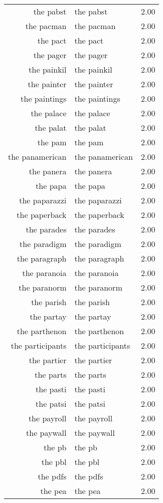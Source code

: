 \begin{table}[ht]
\begin{tabular}{rlr}
  the pabst & the pabst & 2.00 \\ 
  the pacman & the pacman & 2.00 \\ 
  the pact & the pact & 2.00 \\ 
  the pager & the pager & 2.00 \\ 
  the painkil & the painkil & 2.00 \\ 
  the painter & the painter & 2.00 \\ 
  the paintings & the paintings & 2.00 \\ 
  the palace & the palace & 2.00 \\ 
  the palat & the palat & 2.00 \\ 
  the pam & the pam & 2.00 \\ 
  the panamerican & the panamerican & 2.00 \\ 
  the panera & the panera & 2.00 \\ 
  the papa & the papa & 2.00 \\ 
  the paparazzi & the paparazzi & 2.00 \\ 
  the paperback & the paperback & 2.00 \\ 
  the parades & the parades & 2.00 \\ 
  the paradigm & the paradigm & 2.00 \\ 
  the paragraph & the paragraph & 2.00 \\ 
  the paranoia & the paranoia & 2.00 \\ 
  the paranorm & the paranorm & 2.00 \\ 
  the parish & the parish & 2.00 \\ 
  the partay & the partay & 2.00 \\ 
  the parthenon & the parthenon & 2.00 \\ 
  the participants & the participants & 2.00 \\ 
  the partier & the partier & 2.00 \\ 
  the parts & the parts & 2.00 \\ 
  the pasti & the pasti & 2.00 \\ 
  the patsi & the patsi & 2.00 \\ 
  the payroll & the payroll & 2.00 \\ 
  the paywall & the paywall & 2.00 \\ 
  the pb & the pb & 2.00 \\ 
  the pbl & the pbl & 2.00 \\ 
  the pdfs & the pdfs & 2.00 \\ 
  the pea & the pea & 2.00 \\ 

\end{tabular}
\end{table}

